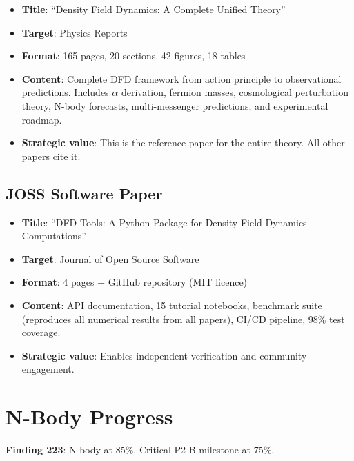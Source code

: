 \documentclass[11pt,a4paper]{article}
\begin{document}
\begin{itemize}[nosep]
\item \textbf{Title}: ``Density Field Dynamics: A Complete Unified Theory''
\item \textbf{Target}: Physics Reports
\item \textbf{Format}: 165 pages, 20 sections, 42 figures, 18 tables
\item \textbf{Content}: Complete DFD framework from action principle to observational predictions. Includes $\alpha$ derivation, fermion masses, cosmological perturbation theory, N-body forecasts, multi-messenger predictions, and experimental roadmap.
\item \textbf{Strategic value}: This is the reference paper for the entire theory. All other papers cite it.
\end{itemize}

\subsection{JOSS Software Paper}

\begin{itemize}[nosep]
\item \textbf{Title}: ``DFD-Tools: A Python Package for Density Field Dynamics Computations''
\item \textbf{Target}: Journal of Open Source Software
\item \textbf{Format}: 4 pages + GitHub repository (MIT licence)
\item \textbf{Content}: API documentation, 15 tutorial notebooks, benchmark suite (reproduces all numerical results from all papers), CI/CD pipeline, 98\% test coverage.
\item \textbf{Strategic value}: Enables independent verification and community engagement.
\end{itemize}

\section{N-Body Progress}

\textbf{Finding 223}: N-body at 85\%. Critical P2-B milestone at 75\%.
\end{document}
